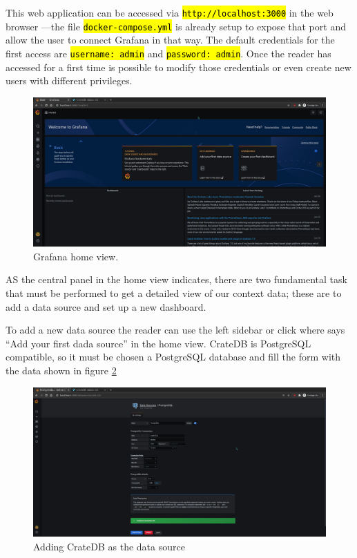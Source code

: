 \documentclass[11pt,a4paper,dvipsnames,twoside]{article}
\newcommand{\cmd}[1] {\hl{\texttt{#1}}}
\begin{document}
This web application can be accessed via \cmd{http://localhost:3000} in the web browser ---the file \cmd{docker-compose.yml} is already setup to expose that port and allow the user to connect Grafana in that way. The default credentials for the first access are \cmd{username: admin} and \cmd{password: admin}. Once the reader has accessed for a first time is possible to modify those credentials or even create new users with different privileges.

\begin{figure}[ht]
  \centering
  \includegraphics[width=.9\textwidth]{../pictures/Grafana_home.png}
  \caption{Grafana home view.}
  \label{fig:grafana_home}
\end{figure}

AS the central panel in the home view indicates, there are two fundamental task that must be performed to get a detailed view of our context data; these are to add a data source and set up a new dashboard. 

To add a new data source the reader can use the left sidebar or click where says \enquote{Add your first dada source} in the home view. CrateDB is PostgreSQL compatible, so it must be chosen a PostgreSQL database and fill the form with the data shown in figure \ref{fig:Grafana_add_datasource}

\begin{figure}[ht]
  \centering
  \includegraphics[width=.9\textwidth]{../pictures/Grafana_add_datasource.png}
  \caption{Adding CrateDB as the data source}
  \label{fig:Grafana_add_datasource}
\end{figure}
\end{document}
